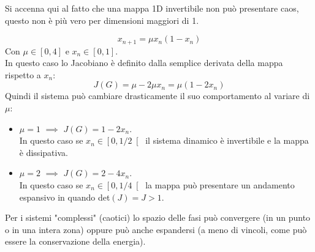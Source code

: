 \noindent
Si accenna qui al fatto che una mappa 1D invertibile non può presentare caos, questo non è più vero per dimensioni maggiori di 1.
\begin{exmp}
    \[
	x_{n+1} = \mu x_n (1-x_n)
    \] 
    Con $\mu\in \left[0, 4\right]$ e $x_n \in \left[0, 1\right]$.\\
    In questo caso lo Jacobiano è definito dalla semplice derivata della mappa rispetto a $x_n$:
    \[
	J(G)=\mu-2\mu x_n = \mu (1-2x_n)
    \] 
    Quindi il sistema può cambiare drasticamente il suo comportamento al variare di $\mu$:
    \begin{itemize}
	\item $\mu  = 1$ $\implies$ $J(G)=1-2x_n$. \\
	    In questo caso se $x_n \in \left[0, 1 /2\right[$ il sistema dinamico è invertibile e la mappa è dissipativa.
	\item $\mu  = 2$ $\implies$ $J(G)=2-4x_n$.\\
	    In questo caso se $x_n \in \left[0, 1 /4\right[$ la mappa può presentare un andamento espansivo in quando det$(J) = J > 1$.
    \end{itemize}
\end{exmp}
\noindent
Per i sistemi "complessi" (caotici) lo spazio delle fasi può convergere (in un punto o in una intera zona) oppure può anche espandersi (a meno di vincoli, come può essere la conservazione della energia).
